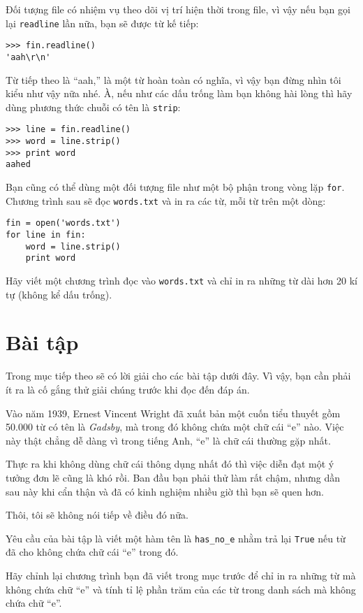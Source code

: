 \documentclass[11pt]{book}
\begin{document}
Đối tượng file có nhiệm vụ theo dõi vị trí hiện thời trong file,
vì vậy nếu bạn gọi lại {\tt readline} lần nữa, bạn sẽ được từ kế tiếp:

\beforeverb
\begin{verbatim}
>>> fin.readline()
'aah\r\n'
\end{verbatim}
\afterverb
%
Từ tiếp theo là ``aah,'' là một từ hoàn toàn có nghĩa, vì vậy
bạn đừng nhìn tôi kiểu như vậy nữa nhé. À, nếu như các dấu trống
làm bạn không hài lòng thì hãy dùng phương thức chuỗi có tên là {\tt strip}:


\beforeverb
\begin{verbatim}
>>> line = fin.readline()
>>> word = line.strip()
>>> print word
aahed
\end{verbatim}
\afterverb
%
Bạn cũng có thể dùng một đối tượng file như một bộ phận trong vòng lặp {\tt for}.
Chương trình sau sẽ đọc {\tt words.txt} và in ra các từ, mỗi từ trên một dòng:


\beforeverb
\begin{verbatim}
fin = open('words.txt')
for line in fin:
    word = line.strip()
    print word
\end{verbatim}
\afterverb
%

\begin{ex}
Hãy viết một chương trình đọc vào {\tt words.txt} và chỉ in ra những từ dài hơn
20 kí tự (không kể dấu trống).

\end{ex}


\section{Bài tập}

Trong mục tiếp theo sẽ có lời giải cho các bài tập dưới đây. Vì vậy, bạn cần
phải ít ra là cố gắng thử giải chúng trước khi đọc đến đáp án.

\begin{ex}
Vào năm 1939, Ernest Vincent Wright đã xuất bản một cuốn tiểu thuyết gồm 50.000 từ
có tên là {\em Gadsby}, mà trong đó không chứa một chữ cái ``e'' nào. Việc này thật
chẳng dễ dàng vì trong tiếng Anh, ``e'' là chữ cái thường gặp nhất.

Thực ra khi không dùng chữ cái thông dụng nhất đó thì việc diễn đạt một ý tưởng
đơn lẽ cũng là khó rồi. Ban đầu bạn phải thử làm rất chậm, nhưng dần sau này khi
cẩn thận và đã có kinh nghiệm nhiều giờ thì bạn sẽ quen hơn.

Thôi, tôi sẽ không nói tiếp về điều đó nữa.

Yêu cầu của bài tập là viết một hàm tên là \verb"has_no_e" nhằm trả lại {\tt True} 
nếu từ đã cho không chứa chữ cái ``e'' trong đó.

Hãy chỉnh lại chương trình bạn đã viết trong mục trước để chỉ in ra những
từ mà không chứa chữ ``e'' và tính tỉ lệ phần trăm của các từ trong danh sách
mà không chứa chữ ``e''.


\end{ex}
\end{document}
